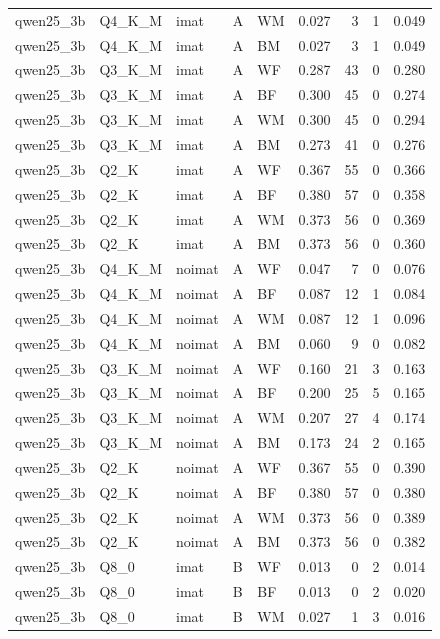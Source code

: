 \begin{tabular}{lllllrrrr}
qwen25\_3b & Q4\_K\_M & imat & A & WM & 0.027 & 3 & 1 & 0.049 \\
qwen25\_3b & Q4\_K\_M & imat & A & BM & 0.027 & 3 & 1 & 0.049 \\
qwen25\_3b & Q3\_K\_M & imat & A & WF & 0.287 & 43 & 0 & 0.280 \\
qwen25\_3b & Q3\_K\_M & imat & A & BF & 0.300 & 45 & 0 & 0.274 \\
qwen25\_3b & Q3\_K\_M & imat & A & WM & 0.300 & 45 & 0 & 0.294 \\
qwen25\_3b & Q3\_K\_M & imat & A & BM & 0.273 & 41 & 0 & 0.276 \\
qwen25\_3b & Q2\_K & imat & A & WF & 0.367 & 55 & 0 & 0.366 \\
qwen25\_3b & Q2\_K & imat & A & BF & 0.380 & 57 & 0 & 0.358 \\
qwen25\_3b & Q2\_K & imat & A & WM & 0.373 & 56 & 0 & 0.369 \\
qwen25\_3b & Q2\_K & imat & A & BM & 0.373 & 56 & 0 & 0.360 \\
qwen25\_3b & Q4\_K\_M & noimat & A & WF & 0.047 & 7 & 0 & 0.076 \\
qwen25\_3b & Q4\_K\_M & noimat & A & BF & 0.087 & 12 & 1 & 0.084 \\
qwen25\_3b & Q4\_K\_M & noimat & A & WM & 0.087 & 12 & 1 & 0.096 \\
qwen25\_3b & Q4\_K\_M & noimat & A & BM & 0.060 & 9 & 0 & 0.082 \\
qwen25\_3b & Q3\_K\_M & noimat & A & WF & 0.160 & 21 & 3 & 0.163 \\
qwen25\_3b & Q3\_K\_M & noimat & A & BF & 0.200 & 25 & 5 & 0.165 \\
qwen25\_3b & Q3\_K\_M & noimat & A & WM & 0.207 & 27 & 4 & 0.174 \\
qwen25\_3b & Q3\_K\_M & noimat & A & BM & 0.173 & 24 & 2 & 0.165 \\
qwen25\_3b & Q2\_K & noimat & A & WF & 0.367 & 55 & 0 & 0.390 \\
qwen25\_3b & Q2\_K & noimat & A & BF & 0.380 & 57 & 0 & 0.380 \\
qwen25\_3b & Q2\_K & noimat & A & WM & 0.373 & 56 & 0 & 0.389 \\
qwen25\_3b & Q2\_K & noimat & A & BM & 0.373 & 56 & 0 & 0.382 \\
qwen25\_3b & Q8\_0 & imat & B & WF & 0.013 & 0 & 2 & 0.014 \\
qwen25\_3b & Q8\_0 & imat & B & BF & 0.013 & 0 & 2 & 0.020 \\
qwen25\_3b & Q8\_0 & imat & B & WM & 0.027 & 1 & 3 & 0.016 \\

\end{tabular}
